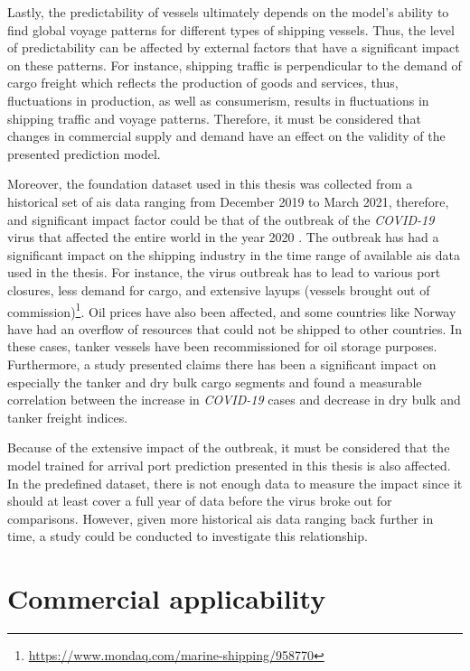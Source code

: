 Lastly, the predictability of vessels ultimately depends on the model's ability to find global voyage patterns for different types of shipping vessels. Thus, the level of predictability can be affected by external factors that have a significant impact on these patterns. For instance, shipping traffic is perpendicular to the demand of cargo freight which reflects the production of goods and services, thus, fluctuations in production, as well as consumerism, results in fluctuations in shipping traffic and voyage patterns. Therefore, it must be considered that changes in commercial supply and demand have an effect on the validity of the presented prediction model.

Moreover, the foundation dataset used in this thesis was collected from a historical set of \acrshort{ais} data ranging from December 2019 to March 2021, therefore, and significant impact factor could be that of the outbreak of the \textit{COVID-19} virus that affected the entire world in the year 2020 \parencite{covid_article}. The outbreak has had a significant impact on the shipping industry in the time range of available \acrshort{ais} data used in the thesis. For instance, the virus outbreak has to lead to various port closures, less demand for cargo, and extensive layups (vessels brought out of commission)\footnote{\url{https://www.mondaq.com/marine-shipping/958770}}. Oil prices have also been affected, and some countries like Norway have had an overflow of resources that could not be shipped to other countries. In these cases, tanker vessels have been recommissioned for oil storage purposes. Furthermore, a study presented \cite{MICHAIL2020100178} claims there has been a significant impact on especially the tanker and dry bulk cargo segments and found a measurable correlation between the increase in \textit{COVID-19} cases and decrease in dry bulk and tanker freight indices.

Because of the extensive impact of the outbreak, it must be considered that the model trained for arrival port prediction presented in this thesis is also affected. In the predefined dataset, there is not enough data to measure the impact since it should at least cover a full year of data before the virus broke out for comparisons. However, given more historical \acrshort{ais} data ranging back further in time, a study could be conducted to investigate this relationship.

\section{Commercial applicability}


